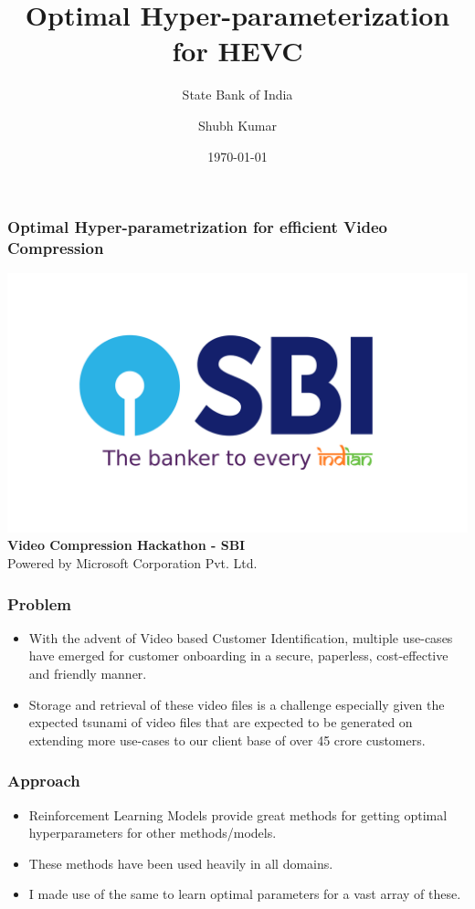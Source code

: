 \documentclass{beamer}
\title{Optimal Hyper-parameterization for HEVC}
\subtitle{State Bank of India}
\author{Shubh Kumar}
\institute{IIT Bombay}
\date{\today}
\begin{document}
\begin{frame}
    \frametitle{Optimal Hyper-parametrization for efficient Video Compression}
    \begin{center}
        \includegraphics[scale=0.02]{im.png}\\
        \textbf{Video Compression Hackathon - SBI} \\

        Powered by Microsoft Corporation Pvt. Ltd.
    \end{center}


\end{frame}



\begin{frame}
    \frametitle{Problem}
    \begin{itemize}
        \item With the advent of Video based Customer Identification, multiple use-cases have emerged for customer onboarding in a secure, paperless, cost-effective and friendly manner.%
        \pause
        \item Storage and retrieval of these video files is a challenge especially given the expected tsunami of video files that are expected to be generated on extending more use-cases to our client base of over 45 crore customers.
    \end{itemize}
\end{frame}


\begin{frame}
    \frametitle{Approach}
    \begin{itemize}
        \item Reinforcement Learning Models provide great methods for getting optimal hyperparameters for other methods/models.
        \pause
        \item These methods have been used heavily in all domains.
        \pause
        \item I made use of the same to learn optimal parameters for a vast array of these.
    \end{itemize}
\end{frame}
\end{document}
